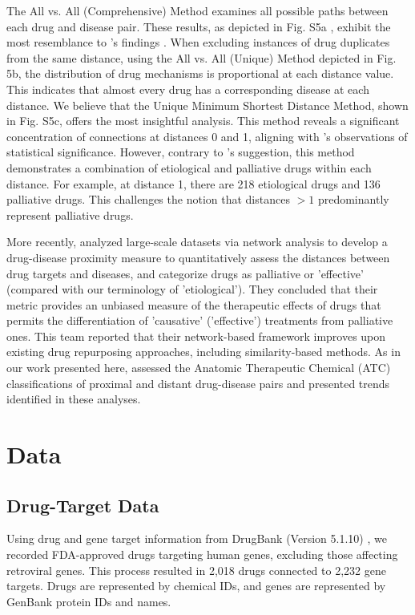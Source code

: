 \documentclass[journal,twoside,web]{ieeecolor}
\begin{document}
The All vs. All (Comprehensive) Method examines all possible paths between each drug and disease pair.
These results, as depicted in Fig. S5a%
, exhibit the most resemblance to \cite{yildirim2007drug}'s findings \cite[Figure~6a]{yildirim2007drug}.
When excluding instances of drug duplicates from the same distance, using the All vs. All (Unique) Method depicted in Fig. 5b,%
the distribution of drug mechanisms is proportional at each distance value.
This indicates that almost every drug has a corresponding disease at each distance.
We believe that the Unique Minimum Shortest Distance Method, shown in  Fig. S5c, %
offers the most insightful analysis.
This method reveals a significant concentration of connections at distances 0 and 1, aligning with \cite{yildirim2007drug}'s observations of statistical significance.
However, contrary to \cite{yildirim2007drug}'s suggestion, this method demonstrates a combination of etiological and palliative drugs within each distance.
For example, at distance 1, there are 218 etiological drugs and 136 palliative drugs.
This challenges the notion that distances $> 1$ predominantly represent palliative drugs.

More recently, \cite{guney2016network} analyzed large-scale datasets via network analysis to develop a drug-disease proximity measure to quantitatively assess the distances between drug targets and diseases, and categorize drugs as palliative or 'effective' (compared with our terminology of 'etiological'). They concluded that their metric provides an unbiased measure of the therapeutic effects of drugs that permits the differentiation of 'causative' ('effective') treatments from palliative ones. This team reported that their network-based framework improves upon existing drug repurposing approaches, including similarity-based methods. As in our work presented here, \cite{guney2016network} assessed the Anatomic Therapeutic Chemical (ATC) classifications of proximal and distant drug-disease pairs and presented trends identified in these analyses.

\section{Data}
\label{sec:materials}
\subsection{Drug-Target Data}
\label{sec:DrugBank_data}
Using drug and gene target information from DrugBank (Version 5.1.10) \cite{wishart2018drugbank}, we recorded FDA-approved drugs targeting human genes, excluding those affecting retroviral genes. This process resulted in 2,018 drugs connected to 2,232 gene targets.
Drugs are represented by chemical IDs, and genes are represented by GenBank \cite{benson2012genbank} protein IDs and names.
\end{document}
